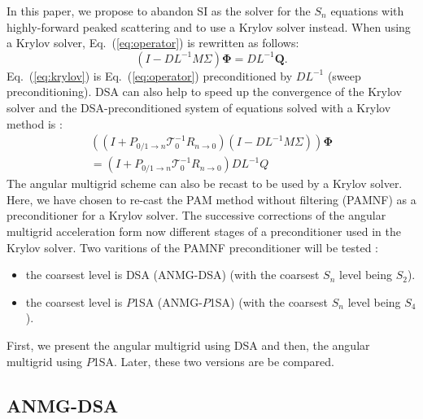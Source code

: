 \documentclass[preprint,10pt]{elsarticle}
\newcommand\bs{\boldsymbol}
\renewcommand{\(}{\left(}
\renewcommand{\)}{\right)}
\renewcommand{\[}{\left[}
\renewcommand{\]}{\right]}
\newcommand{\eqt}[1]{Eq.~(\ref{#1})}                     %
\begin{document}
In this paper, we propose to abandon SI as the solver for the $S_n$ equations with
highly-forward peaked scattering  
and to use a Krylov solver instead. When using a Krylov solver, \eqt{eq:operator} is rewritten as follows:
%
\begin{equation}
(I-DL^{-1}M\Sigma) \bs{\Phi} = DL^{-1}\bs{Q} .
\label{eq:krylov}
\end{equation}
\eqt{eq:krylov} is \eqt{eq:operator}
%
preconditioned by $DL^{-1}$ (sweep preconditioning). 
DSA can also 
help to speed up the convergence of the Krylov solver and the DSA-preconditioned system of equations 
solved with a Krylov method is :
%
\begin{multline}
\((I+P_{0/1 \rightarrow n}\mathcal{T}_0^{-1} R_{n\rightarrow 0})(I-DL^{-1}M\Sigma)\)
\bs{\Phi} \\ = (I+P_{0/1 \rightarrow n}\mathcal{T}_0^{-1} R_{n\rightarrow 0})DL^{-1}Q
\end{multline}       
%
The angular multigrid scheme can also be recast to be used by a Krylov solver. Here, we have chosen
to re-cast the PAM method without filtering (PAMNF) as a preconditioner for a Krylov solver.
The successive corrections of the angular multigrid acceleration form
now different stages of a preconditioner used in the Krylov solver. Two
varitions of the PAMNF preconditioner will be tested :
\begin{itemize}
\item the coarsest level is DSA (ANMG-DSA) (with the coarsest $S_n$ level being $S_2$).
\item the coarsest level is $P$1SA (ANMG-$P$1SA) (with the coarsest $S_n$ level being $S_4$).
\end{itemize}
First, we present the angular multigrid using DSA and then, the angular
multigrid using $P$1SA. Later, these two versions are be compared.

\subsection{ANMG-DSA}
\end{document}
